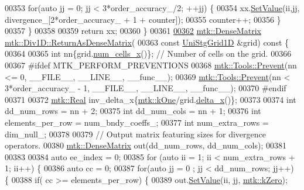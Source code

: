 \begin{DoxyCode}
{{00353     \textcolor{keywordflow}{for}(\textcolor{keyword}{auto} jj = 0; jj < 3*order\_accuracy\_/2; ++jj) \{
00354       xx.\hyperlink{classmtk_1_1DenseMatrix_a784ce5784109ac86bfb9d8562b334b13}{SetValue}(ii,jj, divergence\_[2*order\_accuracy\_ + 1 + counter]);
00355       counter++;
00356     \}
00357   \}
00358 
00359   \textcolor{keywordflow}{return} xx;
00360 \}
00361 
\hypertarget{mtk__div__1d_8cc_source_l00362}{}\hyperlink{classmtk_1_1Div1D_a213fddbaaf86e4840c6a9649b69c2d49}{00362} \hyperlink{classmtk_1_1DenseMatrix}{mtk::DenseMatrix} \hyperlink{classmtk_1_1Div1D_a213fddbaaf86e4840c6a9649b69c2d49}{mtk::Div1D::ReturnAsDenseMatrix}(
00363   \textcolor{keyword}{const} \hyperlink{classmtk_1_1UniStgGrid1D}{UniStgGrid1D} &grid)\textcolor{keyword}{ const }\{
00364 
00365   \textcolor{keywordtype}{int} nn\{grid.\hyperlink{classmtk_1_1UniStgGrid1D_af1b3729d8afa07be5b2775ed68015b80}{num\_cells\_x}()\}; \textcolor{comment}{// Number of cells on the grid.}
00366 
00367 \textcolor{preprocessor}{  #ifdef MTK\_PERFORM\_PREVENTIONS}
00368   \hyperlink{classmtk_1_1Tools_a332324c6f25e66be9dff48c5987a3b9f}{mtk::Tools::Prevent}(nn <= 0, \_\_FILE\_\_, \_\_LINE\_\_, \_\_func\_\_);
00369   \hyperlink{classmtk_1_1Tools_a332324c6f25e66be9dff48c5987a3b9f}{mtk::Tools::Prevent}(nn < 3*order\_accuracy\_ - 1, \_\_FILE\_\_, \_\_LINE\_\_, \_\_func\_\_);
00370 \textcolor{preprocessor}{  #endif}
00371 
00372   \hyperlink{group__c01-roots_gac080bbbf5cbb5502c9f00405f894857d}{mtk::Real} inv\_delta\_x\{\hyperlink{group__c01-roots_ga26407c24d43b6b95480943340d285c71}{mtk::kOne}/grid.\hyperlink{classmtk_1_1UniStgGrid1D_a6e7173b01241632cf509496d66b9f74c}{delta\_x}()\};
00373 
00374   \textcolor{keywordtype}{int} dd\_num\_rows = nn + 2;
00375   \textcolor{keywordtype}{int} dd\_num\_cols = nn + 1;
00376   \textcolor{keywordtype}{int} elements\_per\_row = num\_bndy\_coeffs\_;
00377   \textcolor{keywordtype}{int} num\_extra\_rows = dim\_null\_;
00378 
00379   \textcolor{comment}{// Output matrix featuring sizes for divergence operators.}
00380   \hyperlink{classmtk_1_1DenseMatrix}{mtk::DenseMatrix} out(dd\_num\_rows, dd\_num\_cols);
00381 
00383 
00384   \textcolor{keyword}{auto} ee\_index = 0;
00385   \textcolor{keywordflow}{for} (\textcolor{keyword}{auto} ii = 1; ii < num\_extra\_rows + 1; ii++) \{
00386     \textcolor{keyword}{auto} cc = 0;
00387     \textcolor{keywordflow}{for}(\textcolor{keyword}{auto} jj = 0 ; jj < dd\_num\_rows; jj++) \{
00388       \textcolor{keywordflow}{if}( cc >= elements\_per\_row) \{
00389         out.\hyperlink{classmtk_1_1DenseMatrix_a784ce5784109ac86bfb9d8562b334b13}{SetValue}(ii, jj, \hyperlink{group__c01-roots_ga59a451a5fae30d59649bcda274fea271}{mtk::kZero});
}}
\end{DoxyCode}
